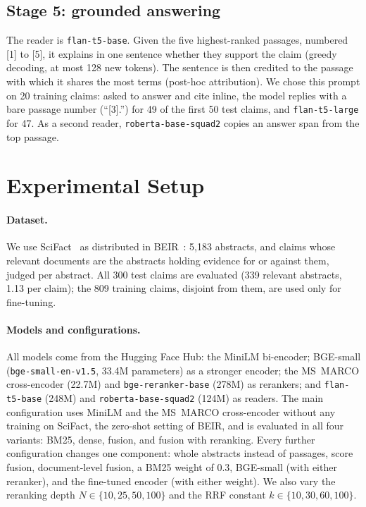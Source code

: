 \documentclass[runningheads]{llncs}
\begin{document}
\subsection{Stage 5: grounded answering}
The reader is \texttt{flan-t5-base}. Given the five highest-ranked passages,
numbered [1] to [5], it explains in one sentence whether they support the claim
(greedy decoding, at most 128 new tokens). The sentence is then credited to
the passage with which it shares the most terms (post-hoc attribution). We chose
this prompt on 20 training claims: asked to answer and cite inline, the model
replies with a bare passage number (``[3].'') for 49 of the first 50 test claims,
and \texttt{flan-t5-large} for 47. As a second reader, \texttt{roberta-base-squad2}
copies an answer span from the top passage.

\section{Experimental Setup}
\label{sec:setup}

\paragraph{Dataset.} We use SciFact~\cite{wadden2020scifact} as distributed in
BEIR~\cite{thakur2021beir}: 5{,}183 abstracts, and claims whose relevant documents
are the abstracts holding evidence for or against them, judged per abstract. All
300 test claims are evaluated (339 relevant abstracts, 1.13 per claim); the 809
training claims, disjoint from them, are used only for fine-tuning.

\paragraph{Models and configurations.} All models come from the Hugging Face Hub:
the MiniLM bi-encoder; BGE-small (\texttt{bge-small-en-v1.5}, 33.4M parameters) as
a stronger encoder; the MS~MARCO cross-encoder (22.7M) and \texttt{bge-reranker-base}
(278M) as rerankers; and \texttt{flan-t5-base} (248M) and \texttt{roberta-base-squad2}
(124M) as readers. The main configuration uses MiniLM and the MS~MARCO
cross-encoder without any training on SciFact, the zero-shot setting of BEIR, and
is evaluated in all four variants: BM25, dense, fusion, and fusion with reranking.
Every further configuration changes one component: whole abstracts instead of
passages, score fusion, document-level fusion, a BM25 weight of 0.3, BGE-small
(with either reranker), and the fine-tuned encoder (with either weight). We also
vary the reranking depth $N\in\{10,25,50,100\}$ and the RRF constant
$k\in\{10,30,60,100\}$.
\end{document}
